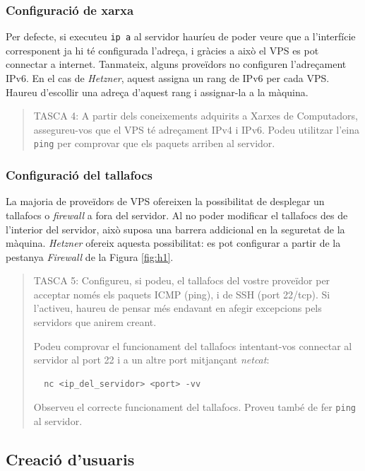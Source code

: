 \documentclass{practicaitic}
\begin{document}
\subsubsection{Configuració de xarxa}

Per defecte, si executeu \texttt{ip a} al servidor hauríeu de poder veure
que a l'interfície corresponent ja hi té configurada l'adreça, i gràcies a
això el VPS es pot connectar a internet. Tanmateix, alguns proveïdors no configuren
l'adreçament IPv6. En el cas de \textit{Hetzner}, aquest assigna un rang de IPv6
per cada VPS. Haureu d'escollir una adreça d'aquest rang i assignar-la a la màquina.

\begin{quote}
TASCA 4: A partir dels coneixements adquirits a Xarxes de Computadors, assegureu-vos
que el VPS té adreçament IPv4 i IPv6. Podeu utilitzar l'eina \texttt{ping} per comprovar
que els paquets arriben al servidor.
\end{quote}

\subsubsection{Configuració del tallafocs}

La majoria de proveïdors de VPS ofereixen la possibilitat de desplegar un
tallafocs o \textit{firewall} a fora del servidor. Al no poder modificar el tallafocs
des de l'interior del servidor, això suposa una barrera addicional en la seguretat
de la màquina. \textit{Hetzner} ofereix aquesta possibilitat: es pot configurar
a partir de la pestanya \textit{Firewall} de la Figura \ref{fig:h1}.

\begin{quote}
TASCA 5: Configureu, si podeu, el tallafocs del vostre proveïdor per acceptar només
els paquets ICMP (ping), i de SSH (port 22/tcp). Si l'activeu, haureu de pensar més endavant en
afegir excepcions pels servidors que anirem creant.

Podeu comprovar el funcionament del tallafocs intentant-vos connectar al
servidor al port 22 i a un altre port mitjançant \textit{netcat}:
\begin{verbatim}
  nc <ip_del_servidor> <port> -vv
\end{verbatim}
Observeu el correcte funcionament del tallafocs. Proveu també de fer
\texttt{ping} al servidor.
\end{quote}

\subsection{Creació d'usuaris}
\end{document}

